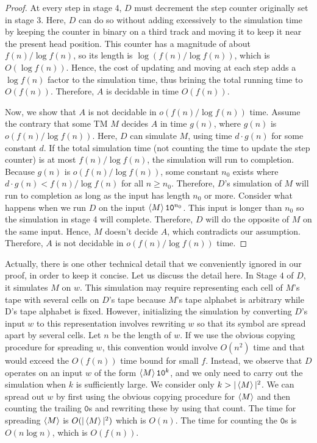 \begin{proof}
  At every step in stage 4, $D$ must decrement the step counter originally set in stage 3. Here, $D$ can do so without adding excessively to the simulation time by keeping the counter in binary on a third track and moving it to keep it near the present head position. This counter has a magnitude of about $f(n) / \log f(n)$, so its length is $\log(f(n) / \log f(n))$, which is $O(\log f(n))$. Hence, the cost of updating and moving at each step adds a $\log f(n)$ factor to the simulation time, thus brining the total running time to $O(f(n))$. Therefore, $A$ is decidable in time $O(f(n))$.

  Now, we show that $A$ is not decidable in $o(f(n) / \log f(n))$ time. Assume the contrary that some TM $M$ decides $A$ in time $g(n)$, where $g(n)$ is $o(f(n) / \log f(n))$. Here, $D$ can simulate $M$, using time $d \cdot g(n)$ for some constant $d$. If the total simulation time (not counting the time to update the step counter) is at most $f(n) / \log f(n)$, the simulation will run to completion. Because $g(n)$ is $o(f(n) / \log f(n))$, some constant $n_0$ exists where $d \cdot g(n) < f(n) / \log f(n)$ for all $n \geq n_0$. Therefore, $D$'s simulation of $M$ will run to completion as long as the input has length $n_0$ or more. Consider what happens when we run $D$ on the input $\left< M \right>\texttt{1}\texttt{0}^{n_0}$. This input is longer than $n_0$ so the simulation in stage 4 will complete. Therefore, $D$ will do the opposite of $M$ on the same input. Hence, $M$ doesn't decide $A$, which contradicts our assumption. Therefore, $A$ is not decidable in $o(f(n) / \log f(n))$ time.
\end{proof}

\begin{remark}
  Actually, there is one other technical detail that we conveniently ignored in our proof, in order to keep it concise. Let us discuss the detail here. In Stage $4$ of $D$, it simulates $M$ on $w$. This simulation may require representing each cell of $M$'s tape with several cells on $D$'s tape because $M$'s tape alphabet is arbitrary while D's tape alphabet is fixed. However, initializing the simulation by converting $D$'s input $w$ to this representation involves rewriting $w$ so that its symbol are spread apart by several cells. Let $n$ be the length of $w$. If we use the obvious copying procedure for spreading $w$, this convention would involve $O(n^2)$ time and that would exceed the $O(f(n))$ time bound for small $f$. Instead, we observe that $D$ operates on an input $w$ of the form $\left< M \right>\texttt{1}\texttt{0}^k$, and we only need to carry out the simulation when $k$ is sufficiently large. We consider only $k > | \left< M \right> |^2$. We can spread out $w$ by first using the obvious copying procedure for $\left< M \right>$ and then counting the trailing $\texttt{0}$s and rewriting these by using that count. The time for spreading $\left< M \right>$ is $O(| \left< M \right> |^2)$ which is $O(n)$. The time for counting the $\texttt{0}$s is $O(n \log n)$, which is $O(f(n))$.
\end{remark}

